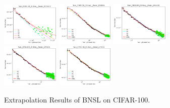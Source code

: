 \documentclass{article} %
\begin{document}
\begin{figure}
\includegraphics[width=0.245\textwidth]{figures/scaling_laws_benchmark_dataset_plots__all_functional_forms/c100_25___BiT_101_3.png}
\includegraphics[width=0.245\textwidth]{figures/scaling_laws_benchmark_dataset_plots__all_functional_forms/c100_25___MiX_B_16.png}
\includegraphics[width=0.245\textwidth]{figures/scaling_laws_benchmark_dataset_plots__all_functional_forms/c100_25___MiX_L_16.png}
\includegraphics[width=0.245\textwidth]{figures/scaling_laws_benchmark_dataset_plots__all_functional_forms/c100_25___ViT_B_16.png}
\includegraphics[width=0.245\textwidth]{figures/scaling_laws_benchmark_dataset_plots__all_functional_forms/c100_25___ViT_S_16.png}

    \caption{
    Extrapolation Results of BNSL on CIFAR-100.
    }
    \label{fig:scaling_laws_benchmark_dataset_all_extrapolations__cifar_100}
\end{figure}
\end{document}

